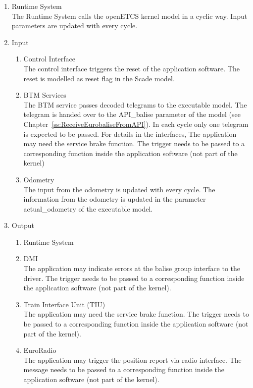\documentclass{template/openetcs_report}
\begin{document}
\begin{enumerate}
\item Runtime System\\
The Runtime System calls the openETCS kernel model in a cyclic way. Input parameters are updated with every cycle.
\item Input
\begin{enumerate}
\item Control Interface\\
The control interface triggers the reset of the application software. The reset is modelled as reset flag in the Scade model.

\item BTM Services\\
The BTM service passes decoded telegrams to the executable model. The telegram is handed over to the API\_balise parameter of the model (see Chapter~\ref{ss:ReceiveEurobaliseFromAPI}). In each cycle only one telegram is expected to be passed. For details in the interfaces, The application may need the service brake function. The trigger needs to be passed to a corresponding function inside the application software (not part of the kernel)

\item Odometry\\
The input from the odometry is updated with every cycle. The information from the odometry is updated in the parameter actual\_odometry of the executable model.
\end{enumerate}

\item Output
\begin{enumerate}
\item Runtime System\\
\item DMI\\
The application may indicate errors at the balise group interface to the driver. The trigger needs to be passed to a corresponding function inside the application software (not part of the kernel).
\item Train Interface Unit (TIU)\\
The application may need the service brake function. The trigger needs to be passed to a corresponding function inside the application software (not part of the kernel).
\item EuroRadio\\
The application may trigger the position report via radio interface. The message needs to be passed to a corresponding function inside the application software (not part of the kernel).
\end{enumerate}

\end{enumerate}
\end{document}
